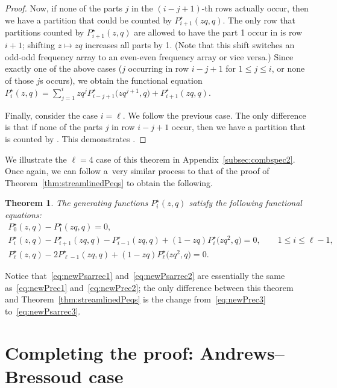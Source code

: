 \documentclass[pdftex]{sigma}
\numberwithin{equation}{section}
\newtheorem{Theorem}{Theorem}[section]
\theoremstyle{definition}
\begin{document}
\begin{proof}
Now, if none of the parts $j$ in the $(i-j+1)$-th rows actually occur, then we have a partition that could be counted by $P^\star_{i+1}(zq,q)$. The only row that partitions counted by $P^\star_{i+1}(z,q)$ are allowed to have the part 1 occur in is row $i+1$; shifting $z\mapsto zq$ increases all parts by 1. (Note that this shift switches an odd-odd frequency array to an even-even frequency array or vice versa.) Since exactly one of the above cases ($j$ occurring in row $i-j+1$ for $1 \le j \le i$, or none of those $j$s occurs), we obtain the functional equation $P^\star_i(z,q) = \sum_{j=1}^i zq^j P^\star_{i-j+1}\bigl(zq^{j+1},q\bigr)+ P^\star_{i+1}(zq,q)$.

Finally, consider the case $i=\ell$. We follow the previous case. The only difference is that if none of the parts $j$ in row $i-j+1$ occur, then we have a partition that is counted by . This demonstrates .
\end{proof}

We illustrate the $\ell=4$ case of this theorem in Appendix~\ref{subsec:combspec2}. Once again, we can follow a~very similar process to that of the proof of Theorem~\ref{thm:streamlinedPeqs} to obtain the following.
\begin{Theorem}
The generating functions $P^\star_i(z,q)$ satisfy the following functional equations:
\begin{gather}
P^\star_0(z,q)-P^\star_1(zq,q) =0,\label{eq:newPsarrec1} \\
P^\star_i(z,q) - P^\star_{i+1}(zq,q) - P^\star_{i-1}(zq,q) + (1-zq)P^\star_{i}\bigl(zq^2,q\bigr) =0, \qquad 1 \le i \le \ell-1, \label{eq:newPsarrec2} \\
P^\star_\ell(z,q) - 2P^\star_{\ell-1}(zq,q) + (1-zq) P^\star_{\ell}\bigl(zq^2,q\bigr) = 0.\label{eq:newPsarrec3}
\end{gather}
\end{Theorem}
Notice that~\eqref{eq:newPsarrec1} and~\eqref{eq:newPsarrec2} are essentially the same as~\eqref{eq:newPrec1} and~\eqref{eq:newPrec2}; the only difference between this theorem and Theorem~\ref{thm:streamlinedPeqs} is the change from~\eqref{eq:newPrec3} to~\eqref{eq:newPsarrec3}.

\section{Completing the proof: Andrews--Bressoud case}\label{sec:comp5}
\end{document}
